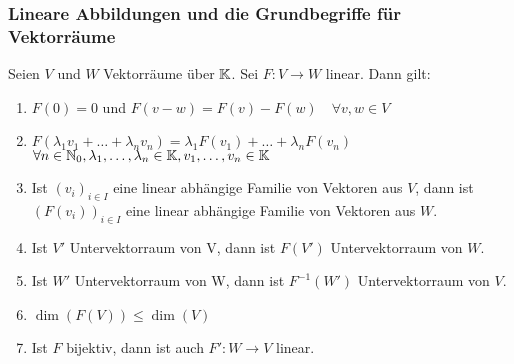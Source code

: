\subsubsection{Lineare Abbildungen und die Grundbegriffe für Vektorräume}
\begin{propn}
	Seien $ V $ und $ W $ Vektorräume über $ \mathbb K $. Sei $ F: V \to W $ linear. Dann gilt:
	\begin{enumerate}
		\item
			$ F(0) = 0 $ und $ F(v-w) = F(v) - F(w) \quad \forall v,w \in V $
		\item
			$ F(\lambda_1 v_1 + \ldots + \lambda_n v_n) = \lambda_1 F(v_1) + \ldots + \lambda_n F(v_n) $ \\ $ \forall n \in \mathbb N_0, \lambda_1, \ldots, \lambda_n \in \mathbb K, v_1, \ldots, v_n \in \mathbb K $
		\item
			Ist $ (v_i)_{i \in I} $ eine linear abhängige Familie von Vektoren aus $ V $, dann ist $ (F(v_i))_{i \in I} $ eine linear abhängige Familie von Vektoren aus $ W $.
		\item
			Ist $ V' $ Untervektorraum von V, dann ist $ F(V') $ Untervektorraum von $ W $.
		\item
			Ist $ W' $ Untervektorraum von W, dann ist $ F^{-1}(W') $ Untervektorraum von $ V $.
		\item
			$ \dim(F(V)) \leq \dim(V) $
		\item
			Ist $ F $ bijektiv, dann ist auch $ F' : W \to V $ linear.
	\end{enumerate}
\end{propn}
